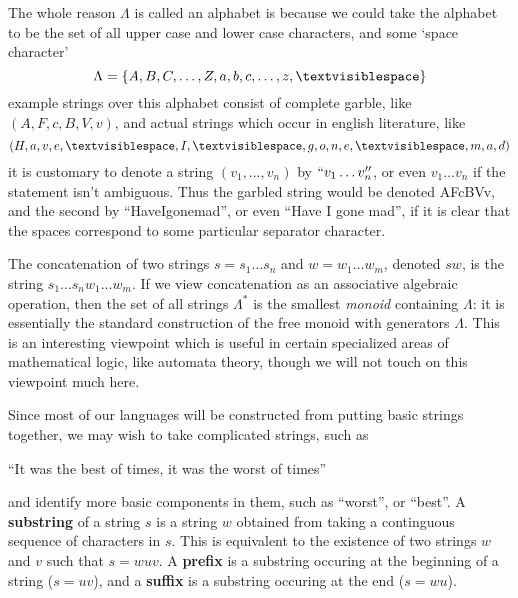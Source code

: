 \begin{example}
    The whole reason $\Lambda$ is called an alphabet is because we could take the alphabet to be the set of all upper case and lower case characters, and some `space character'
    \[ \Lambda = \{ A,B,C,\dots,Z, a,b,c,\dots,z,\textvisiblespace \} \]
    example strings over this alphabet consist of complete garble, like $(A,F,c,B,V,v)$, and actual strings which occur in english literature, like
    \[ (H,a,v,e,\textvisiblespace,I,\textvisiblespace,g,o,n,e,\textvisiblespace,m,a,d) \]
    it is customary to denote a string $(v_1, \dots, v_n)$ by $``v_1 \dots v_n''$, or even $v_1 \dots v_n$ if the statement isn't ambiguous. Thus the garbled string would be denoted AFcBVv, and the second by ``Have\textvisiblespace I\textvisiblespace gone\textvisiblespace mad'', or even ``Have I gone mad'', if it is clear that the spaces correspond to some particular separator character.
\end{example}

The concatenation of two strings $s = s_1 \dots s_n$ and $w = w_1 \dots w_m$, denoted $sw$, is the string $s_1 \dots s_n w_1 \dots w_m$. If we view concatenation as an associative algebraic operation, then the set of all strings $\Lambda^*$ is the smallest {\it monoid} containing $\Lambda$: it is essentially the standard construction of the free monoid with generators $\Lambda$. This is an interesting viewpoint which is useful in certain specialized areas of mathematical logic, like automata theory, though we will not touch on this viewpoint much here.

Since most of our languages will be constructed from putting basic strings together, we may wish to take complicated strings, such as
%
\begin{center}
    ``It was the best of times, it was the worst of times''
\end{center}
%
and identify more basic components in them, such as ``worst'', or ``best''. A {\bf substring} of a string $s$ is a string $w$ obtained from taking a continguous sequence of characters in $s$. This is equivalent to the existence of two strings $w$ and $v$ such that $s = wuv$. A {\bf prefix} is a substring occuring at the beginning of a string ($s = uv$), and a {\bf suffix} is a substring occuring at the end ($s = wu$).

